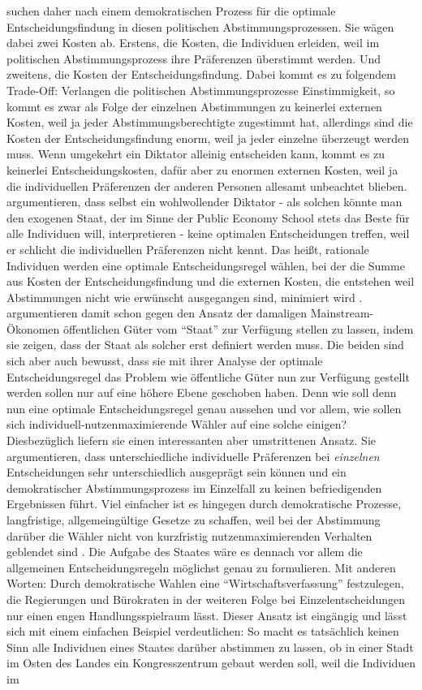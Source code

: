 \textcite{Buchanan1962} suchen daher nach einem demokratischen Prozess für die optimale Entscheidungsfindung in diesen politischen Abstimmungsprozessen. Sie wägen dabei zwei Kosten ab. Erstens, die Kosten, die Individuen erleiden, weil im politischen Abstimmungsprozess ihre Präferenzen überstimmt werden. Und zweitens, die Kosten der Entscheidungsfindung. Dabei kommt es zu folgendem Trade-Off: Verlangen die politischen Abstimmungsprozesse Einstimmigkeit, so kommt es zwar als Folge der einzelnen Abstimmungen zu keinerlei externen Kosten, weil ja jeder Abstimmungsberechtigte zugestimmt hat, allerdings sind die Kosten der Entscheidungsfindung enorm, weil ja jeder einzelne überzeugt werden muss. Wenn umgekehrt ein Diktator alleinig entscheiden kann, kommt es zu keinerlei Entscheidungskosten, dafür aber zu enormen externen Kosten, weil ja die individuellen Präferenzen der anderen Personen allesamt unbeachtet blieben. \textcite{Buchanan1962} argumentieren, dass selbst ein wohlwollender Diktator - als solchen könnte man den exogenen Staat, der im Sinne der Public Economy School stets das Beste für alle Individuen will, interpretieren - keine optimalen Entscheidungen treffen, weil er schlicht die individuellen Präferenzen nicht kennt. Das heißt, rationale Individuen werden eine optimale Entscheidungsregel wählen, bei der die Summe aus Kosten der Entscheidungsfindung und die externen Kosten, die entstehen weil Abstimmungen nicht wie erwünscht ausgegangen sind, minimiert wird \parencite[S. 71]{Buchanan1962}. \textcite{Buchanan1962} argumentieren damit schon gegen den Ansatz der damaligen Mainstream-Ökonomen öffentlichen Güter vom "`Staat"' zur Verfügung stellen zu lassen, indem sie zeigen, dass der Staat als solcher erst definiert werden muss. Die beiden sind sich aber auch bewusst, dass sie mit ihrer Analyse der optimale Entscheidungsregel das Problem wie öffentliche Güter nun zur Verfügung gestellt werden sollen nur auf eine höhere Ebene geschoben haben. Denn wie soll denn nun eine optimale Entscheidungsregel genau aussehen und vor allem, wie sollen sich individuell-nutzenmaximierende Wähler auf eine solche einigen? Diesbezüglich liefern sie einen interessanten aber umstrittenen Ansatz. Sie argumentieren, dass unterschiedliche individuelle Präferenzen bei \textit{einzelnen} Entscheidungen sehr unterschiedlich ausgeprägt sein können und ein demokratischer Abstimmungsprozess im Einzelfall zu keinen befriedigenden Ergebnissen führt. Viel einfacher ist es hingegen durch demokratische Prozesse, langfristige, allgemeingültige Gesetze zu schaffen, weil bei der Abstimmung darüber die Wähler nicht von kurzfristig nutzenmaximierenden Verhalten geblendet sind \parencite[S. 78]{Buchanan1962}. Die Aufgabe des Staates wäre es dennach vor allem die allgemeinen Entscheidungsregeln möglichst genau zu formulieren. Mit anderen Worten: Durch demokratische Wahlen eine "`Wirtschaftsverfassung"' festzulegen, die Regierungen und Bürokraten in der weiteren Folge bei Einzelentscheidungen nur einen engen Handlungsspielraum lässt. Dieser Ansatz ist eingängig und lässt sich mit einem einfachen Beispiel verdeutlichen: So macht es tatsächlich keinen Sinn alle Individuen eines Staates darüber abstimmen zu lassen, ob in einer Stadt im Osten des Landes ein Kongresszentrum gebaut werden soll, weil die Individuen im 